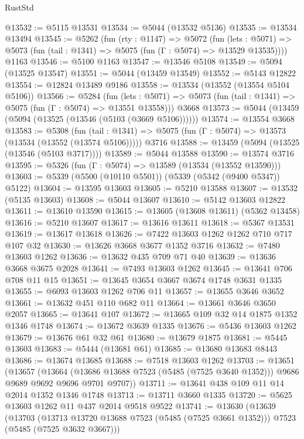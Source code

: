 \begin{lexlean}{RustStd}
\begin{coremodule}
@13532 := @5115 @13531
@13534 := @5044 (@13532 @5136)
@13535 := @13534 @13494
@13545 := @5262
    (fun (rty : @1147) =>
    @5072
      (fun (lets : @5071) =>
      @5073 (fun (tail : @1341) => @5075 (fun (Γ : @5074) => @13529 @13535))))
    @1163
@13546 := @5100 @1163
@13547 := @13546 @5108
@13549 := @5094 (@13525 @13547)
@13551 := @5044 (@13459 @13549)
@13552 := @5143 @12822
@13554 := @12824 @13489 @9186
@13558 := @13534 (@13552 (@13554 @5104 @5106))
@13566 := @5284
    (fun (lets : @5071) => @5073 (fun (tail : @1341) => @5075 (fun (Γ : @5074) => @13551 @13558)))
    @3668
@13573 := @5044 (@13459 (@5094 (@13525 (@13546 (@5103 (@3669 @5106))))))
@13574 := @13554 @3668
@13583 := @5308
    (fun (tail : @1341) => @5075 (fun (Γ : @5074) => @13573 (@13534 (@13552 (@13574 @5106)))))
    @3716
@13588 := @13459 (@5094 (@13525 (@13546 (@5103 @3717))))
@13589 := @5044 @13588
@13590 := @13574 @3716
@13595 := @5326 (fun (Γ : @5074) => @13589 (@13534 (@13552 @13590)))
@13603 := @5339 (@5500 (@10110 @5501)) (@5339 (@5342 (@9400 @5347)) @5122)
@13604 := @13595 @13603
@13605 := @5210 @13588
@13607 := @13532 (@5135 @13603)
@13608 := @5044 @13607
@13610 := @5142 @13603 @12822
@13611 := @13610 @13590
@13615 := @13605 (@13608 @13611) (@5362 @13458)
@13616 := @5210 @13607
@13617 := @13616 @13611
@13618 := @5367 @13531
@13619 := @13617 @13618
@13626 := @7422 @13603 @1262 @1262 @710 @717 @107 @32
@13630 := @13626 @3668 @3677 @1352 @3716
@13632 := @7480 @13603 @1262
@13636 := @13632 @435 @709 @71 @40
@13639 := @13636 @3668 @3675 @2028
@13641 := @7493 @13603 @1262
@13645 := @13641 @706 @708 @11 @15
@13651 := @13645 @3654 @3667 @3674 @1748 @3631 @1335
@13655 := @6093 @13603 @1262 @706 @11
@13657 := @13655 @3646 @3652
@13661 := @13632 @451 @110 @682 @11
@13664 := @13661 @3646 @3650 @2057
@13665 := @13641 @107
@13672 := @13665 @109 @32 @14 @1875 @1352 @1346 @1748
@13674 := @13672 @3639 @1335
@13676 := @5436 @13603 @1262
@13679 := @13676 @61 @32 @61
@13680 := @13679 @1875
@13681 := @5445 @13603
@13683 := @5444 (@13681 @61)
@13685 := @13680 @13683 @8443
@13686 := @13674 @13685
@13688 := @7518 @13603 @1262
@13703 := @13651
    (@13657
      (@13664
        (@13686 @13688 @7523 (@5485 (@7525 @3640 @1352)))
        @9686
        @9689
        @9692
        @9696
        @9701
        @9707))
@13711 := @13641 @438 @109 @11 @14 @2014 @1352 @1346 @1748
@13713 := @13711 @3660 @1335
@13720 := @5625 @13603 @1262 @11 @437 @2014 @9518 @9522
@13741 := @13630
    (@13639
      (@13703
        (@13713 @13720 @13688 @7523 (@5485 (@7525 @3661 @1352)))
        @7523
        (@5485 (@7525 @3632 @3667)))

\end{coremodule}
\end{lexlean}
